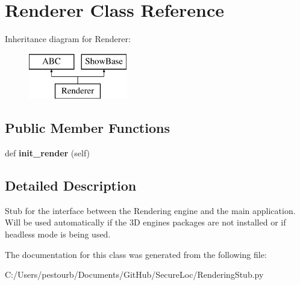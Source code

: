 \hypertarget{class_rendering_stub_1_1_renderer}{}\section{Renderer Class Reference}
\label{class_rendering_stub_1_1_renderer}
Inheritance diagram for Renderer\+:\begin{figure}[H]
\begin{center}
\leavevmode
\includegraphics[height=2.000000cm]{class_rendering_stub_1_1_renderer}
\end{center}
\end{figure}
\subsection*{Public Member Functions}
\begin{DoxyCompactItemize}
\item 
\mbox{\label{class_rendering_stub_1_1_renderer_af4c0dae777b9590cfc07035425b4d36f}} 
def {\bfseries init\+\_\+render} (self)
\end{DoxyCompactItemize}


\subsection{Detailed Description}
\begin{DoxyVerb}Stub for the interface between the Rendering engine and the main application.
Will be used automatically if the 3D engines packages are not installed
or if headless mode is being used.\end{DoxyVerb}
 

The documentation for this class was generated from the following file\+:\begin{DoxyCompactItemize}
\item 
C\+:/\+Users/pestourb/\+Documents/\+Git\+Hub/\+Secure\+Loc/Rendering\+Stub.\+py\end{DoxyCompactItemize}
